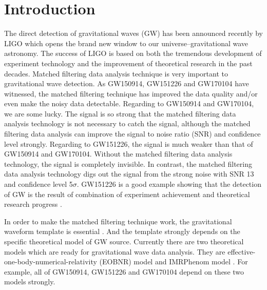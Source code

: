 \documentclass[prd,aps,a4paper,superscriptaddress,twocolumn,footinbib,showpacs]{revtex4}
\begin{document}
\maketitle


\section{Introduction}
The direct detection of gravitational waves (GW) has been announced recently by LIGO \cite{Abbott:2016blz,Abbott:2016nmj,PhysRevLett.118.221101} which opens the brand new window to our universe--gravitational wave astronomy. The success of LIGO is based on both the tremendous development of experiment technology and the improvement of theoretical research in the past decades. Matched filtering data analysis technique is very important to gravitational wave detection. As GW150914, GW151226 and GW170104 have witnessed, the matched filtering technique has improved the data quality and/or even make the noisy data detectable. Regarding to GW150914 and GW170104, we are some lucky. The signal is so strong that the matched filtering data analysis technology is not necessary to catch the signal, although the matched filtering data analysis can improve the signal to noise ratio (SNR) and confidence level strongly. Regarding to GW151226, the signal is much weaker than that of GW150914 and GW170104. Without the matched filtering data analysis technology, the signal is completely invisible. In contrast, the matched filtering data analysis technology digs out the signal from the strong noise with SNR 13 and confidence level 5$\sigma$. GW151226 is a good example showing that the detection of GW is the result of combination of experiment achievement and theoretical research progress \cite{cao2016gravitational}.

In order to make the matched filtering technique work, the gravitational waveform template is essential \cite{cao2016gravitational}. And the template strongly depends on the specific theoretical model of GW source. Currently there are two theoretical models which are ready for gravitational wave data analysis. They are effective-one-body-numerical-relativity (EOBNR) model \cite{PhysRevD.89.061502} and IMRPhenom model \cite{PhysRevLett.116.241102}. For example, all of GW150914, GW151226 and GW170104 depend on these two models strongly.
\end{document}
